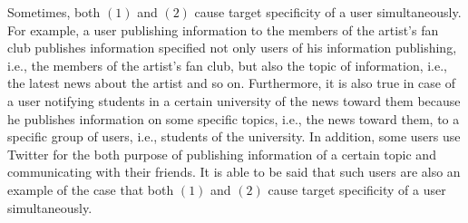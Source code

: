 Sometimes, both $(1)$ and $(2)$ cause target specificity of a
user simultaneously.  For example, a user publishing information to
the members of the artist's fan club publishes information specified not
only users of his information publishing, i.e., the members of the
artist's fan club, but also the topic of information, i.e., the latest news
about the artist and so on.  Furthermore, it is also true in case of a
user notifying students in a certain university of the news toward
them because he publishes information on some specific topics, i.e., the
news toward them, to a specific group of users, i.e., students of the
university.  In addition, some users use
Twitter for the both purpose of publishing information of a certain
topic and communicating with their friends.  It is able to be said that
such users are also an example of the case that both $(1)$ and $(2)$
cause target specificity of a user simultaneously.